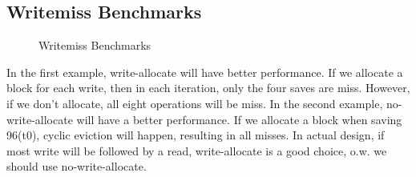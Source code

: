 \documentclass[utf8]{article}
\begin{document}

\newpage
\subsection{Writemiss Benchmarks}
\begin{figure}[h]
	\centering
	\caption{Writemiss Benchmarks}
	\label{fig:screenshot007}
\end{figure}

In the first example, write-allocate will have better performance. If we allocate a block for each write, then in each iteration, only the four saves are miss. However, if we don't allocate, all eight operations will be miss. In the second example, no-write-allocate will have a better performance. If we allocate a block when saving 96(t0), cyclic eviction will happen, resulting in all misses. In actual design, if most write will be followed by a read, write-allocate is a good choice, o.w. we should use no-write-allocate.
\newline
\end{document}
